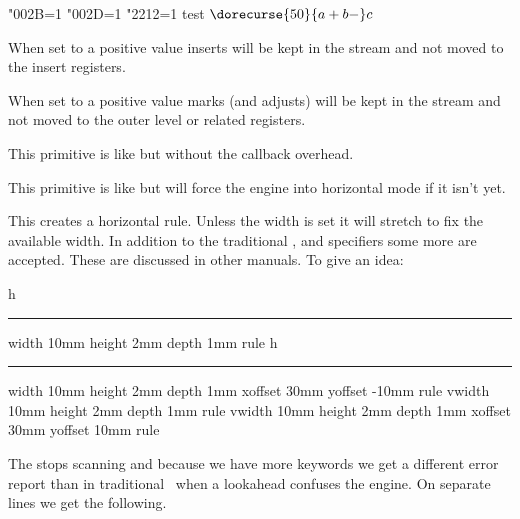\bgroup
    \hmcode"002B=1 %
    \hmcode"002D=1 %
    \hmcode"2212=1 %
    test $ \dorecurse{50}{a + b - } c$
\egroup
\stopbuffer

\typebuffer

{\getbuffer}

\stopnewprimitive

\startoldprimitive[title={\prm {holdinginserts}}]

When set to a positive value inserts will be kept in the stream and not moved to
the insert registers.

\stopoldprimitive

\startnewprimitive[title={\prm {holdingmigrations}}]

When set to a positive value marks (and adjusts) will be kept in the stream and
not moved to the outer level or related registers.

\stopnewprimitive

\startnewprimitive[title={\prm {hpack}}]

This primitive is like  but without the callback overhead.

\stopnewprimitive

\startnewprimitive[title={\prm {hpenalty}}]

This primitive is like  but will force the engine into horizontal
mode if it isn't yet.

\stopnewprimitive

\startoldprimitive[title={\prm {hrule}}]

This creates a horizontal rule. Unless the width is set it will stretch to fix
the available width. In addition to the traditional , 
and  specifiers some more are accepted. These are discussed in other
manuals. To give an idea:

\startbuffer
h\hrule width 10mm height 2mm depth 1mm \relax rule
h\hrule width 10mm height 2mm depth 1mm xoffset 30mm yoffset -10mm \relax rule
v\vrule width 10mm height 2mm depth 1mm \relax rule
v\vrule width 10mm height 2mm depth 1mm xoffset 30mm yoffset  10mm \relax rule
\stopbuffer

\typebuffer

The  stops scanning and because we have more keywords we get a
different error report than in traditional \TEX\ when a lookahead confuses the
engine. On separate lines we get the following.

\startlines
\getbuffer
\stoplines


